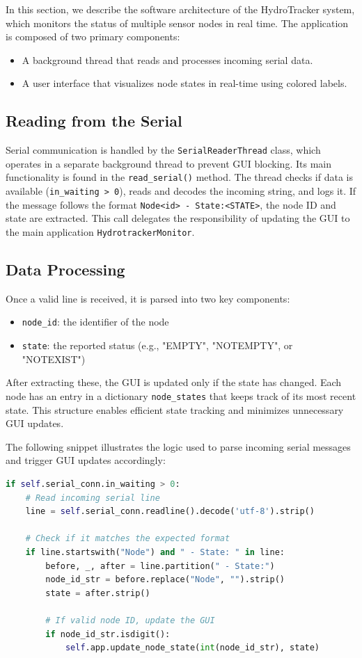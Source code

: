 In this section, we describe the software architecture of the HydroTracker system, which monitors the status of multiple sensor nodes in real time. The application is composed of two primary components:
\begin{itemize}
    \item A background thread that reads and processes incoming serial data.
    \item A user interface that visualizes node states in real-time using colored labels.
\end{itemize}

\subsection{Reading from the Serial}

Serial communication is handled by the \texttt{SerialReaderThread} class, which operates in a separate background thread to prevent GUI blocking. Its main functionality is found in the \texttt{read\_serial()} method. The thread checks if data is available (\texttt{in\_waiting > 0}), reads and decodes the incoming string, and logs it. If the message follows the format \texttt{Node<id> - State:<STATE>}, the node ID and state are extracted. This call delegates the responsibility of updating the GUI to the main application \texttt{HydrotrackerMonitor}.

\subsection{Data Processing}
Once a valid line is received, it is parsed into two key components:
\begin{itemize}
    \item \texttt{node\_id}: the identifier of the node
    \item \texttt{state}: the reported status (e.g., "EMPTY", "NOTEMPTY", or "NOTEXIST")
\end{itemize}
After extracting these, the GUI is updated only if the state has changed. Each node has an entry in a dictionary \texttt{node\_states} that keeps track of its most recent state. This structure enables efficient state tracking and minimizes unnecessary GUI updates.

The following snippet illustrates the logic used to parse incoming serial messages and trigger GUI updates accordingly:
\begin{lstlisting}[language=Python, caption={Serial data parsing and GUI update}]
if self.serial_conn.in_waiting > 0:
    # Read incoming serial line
    line = self.serial_conn.readline().decode('utf-8').strip()
    
    # Check if it matches the expected format
    if line.startswith("Node") and " - State: " in line:
        before, _, after = line.partition(" - State:")
        node_id_str = before.replace("Node", "").strip()
        state = after.strip()
        
        # If valid node ID, update the GUI
        if node_id_str.isdigit():
            self.app.update_node_state(int(node_id_str), state)
\end{lstlisting}

